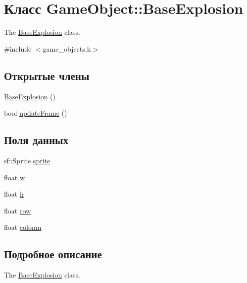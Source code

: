 \hypertarget{classGameObject_1_1BaseExplosion}{}\section{Класс Game\+Object\+:\+:Base\+Explosion}
\label{classGameObject_1_1BaseExplosion}


The \hyperlink{classGameObject_1_1BaseExplosion}{Base\+Explosion} class.  




{\ttfamily \#include $<$game\+\_\+objects.\+h$>$}

\subsection*{Открытые члены}
\begin{DoxyCompactItemize}
\item 
\hyperlink{classGameObject_1_1BaseExplosion_aa7fa02ce95e2dd9cd91fe845ec99668f}{Base\+Explosion} ()
\item 
bool \hyperlink{classGameObject_1_1BaseExplosion_ae87cb3cb807223fcbc113a785886cc7a}{update\+Frame} ()
\end{DoxyCompactItemize}
\subsection*{Поля данных}
\begin{DoxyCompactItemize}
\item 
sf\+::\+Sprite \hyperlink{classGameObject_1_1BaseExplosion_affea6677e855c484ce9627b6cc455cda}{sprite}
\item 
float \hyperlink{classGameObject_1_1BaseExplosion_ade5becc1e6e278fd529df839286daa48}{w}
\item 
float \hyperlink{classGameObject_1_1BaseExplosion_a1ee54235dfe58e3a75c19721135d0d87}{h}
\item 
float \hyperlink{classGameObject_1_1BaseExplosion_a8209c6eb059c2e9391c10048064b0781}{row}
\item 
float \hyperlink{classGameObject_1_1BaseExplosion_ab035aca99e6764293c5b83a6405c7c97}{colomn}
\end{DoxyCompactItemize}


\subsection{Подробное описание}
The \hyperlink{classGameObject_1_1BaseExplosion}{Base\+Explosion} class. 

